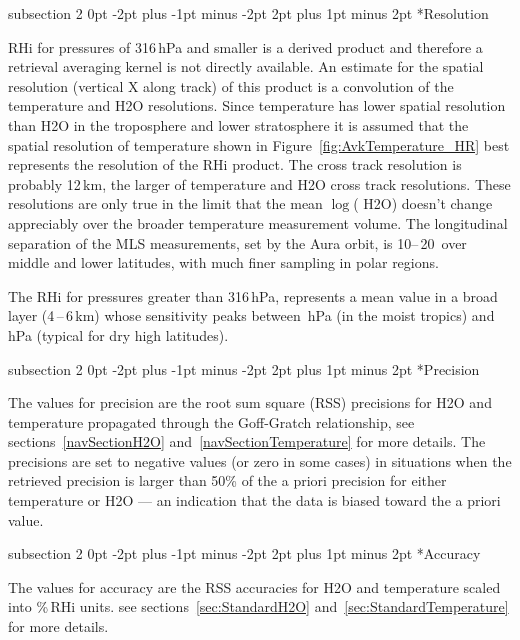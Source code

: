 \documentclass[11pt,draft]{report}
\makeatletter
\renewcommand{\subsection}{\@startsection%
  {subsection}%
  {2}%
  {0pt}%
  {-2pt plus -1pt minus -2pt}%
  {2pt plus 1pt minus 2pt}%
  {\large\sffamily\fontseries{sb}\selectfont\flushleft\color{SectionColor}\figureversion{tabular}}}%
\makeatother
\begin{document}
\subsection*{Resolution}

RHi for pressures of 316\,hPa and smaller is a derived product and
therefore a retrieval averaging kernel is not directly available.  An
estimate for the spatial resolution (vertical X along track) of this
product is a convolution of the temperature and H\cs2O
resolutions. Since temperature has lower spatial resolution than H\cs2O
in the troposphere and lower stratosphere it is assumed that the spatial
resolution of temperature shown in Figure~\ref{fig:AvkTemperature_HR}
best represents the resolution of the RHi product. The cross track
resolution is probably 12\,km, the larger of temperature and H\cs2O
cross track resolutions.  These resolutions are only true in the limit
that the mean $\log$( H\cs2O) doesn't change appreciably over the
broader temperature measurement volume. The longitudinal separation of
the MLS measurements, set by the Aura orbit, is 10\degsym--\,20\degsym\
over middle and lower latitudes, with much finer sampling in polar
regions.

The RHi for pressures greater than 316\,hPa, represents a mean value in
a broad layer (4\,--\,6\,km) whose sensitivity peaks between
\,hPa (in the moist tropics) and \,hPa
(typical for dry high latitudes).

\subsection*{Precision}

The values for precision are the root sum square (RSS) precisions for
H\cs2O and temperature propagated through the Goff-Gratch relationship,
see sections~\ref{navSectionH2O} and~\ref{navSectionTemperature} for
more details. The precisions are set to negative values (or zero in some
cases) in situations when the retrieved precision is larger than 50\% of
the a priori precision for either temperature or H\cs2O --- an
indication that the data is biased toward the a priori value.

\subsection*{Accuracy}

The values for accuracy are the RSS accuracies for H\cs2O and
temperature scaled into \%\,RHi units. see
sections~\ref{sec:StandardH2O} and~\ref{sec:StandardTemperature} for
more details.
\end{document}
